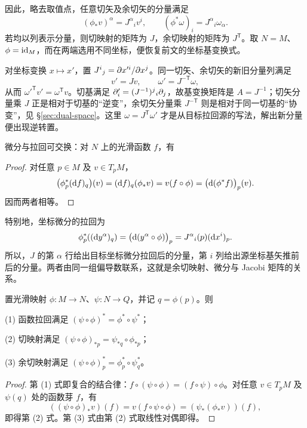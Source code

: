 因此，略去取值点，任意切矢及余切矢的分量满足
\[
    (\phi_*v)^\alpha=J^\alpha{}_i v^i,\qquad
    (\phi^*\omega)_i=J^\alpha{}_i\omega_\alpha.
\]
若均以列表示分量，则切映射的矩阵为 $J$，余切映射的矩阵为 $J^{\mathsf T}$。取 $N=M$、$\phi=\mathrm{id}_M$，而在两端选用不同坐标，便恢复前文的坐标基变换式。

\begin{remark}
    对坐标变换 $x\mapsto x'$，置 $J^i{}_j=\partial x'^i/\partial x^j$。同一切矢、余切矢的新旧分量列满足
    \[v'=Jv,\qquad \omega'=J^{-\mathsf T}\omega,\]
    从而 $\omega'^{\mathsf T}v'=\omega^{\mathsf T}v$。切基满足 $\partial'_i=(J^{-1})^j{}_i\partial_j$，故基变换矩阵是 $A=J^{-1}$；切矢分量乘 $J$ 正是相对于切基的“逆变”，余切矢分量乘 $J^{-\mathsf T}$ 则是相对于同一切基的“协变”，见 \S\ref{sec:dual-space}。这里 $\omega=J^{\mathsf T}\omega'$ 才是从目标拉回源的写法，解出新分量便出现逆转置。
\end{remark}

\begin{proposition}
    微分与拉回可交换：对 $N$ 上的光滑函数 $f$，有
\end{proposition}
\begin{proof}
    对任意 $p\in M$ 及 $v\in T_pM$，
    \[
        \bigl(\phi_p^*(\dd f)_q\bigr)(v)
        =(\dd f)_q(\phi_*v)=v(f\circ\phi)
        =\bigl(\dd(\phi^*f)\bigr)_p(v).
    \]
    因而两者相等。
\end{proof}

特别地，坐标微分的拉回为
\[
    \phi_p^*((\dd y^\alpha)_q)
    =\bigl(\dd(y^\alpha\circ\phi)\bigr)_p
    =J^\alpha{}_i(p)(\dd x^i)_p.
\]
所以，$J$ 的第 $\alpha$ 行给出目标坐标微分拉回后的分量，第 $i$ 列给出源坐标基矢推前后的分量。两者由同一组偏导数联系，这就是余切映射、微分与 Jacobi 矩阵的关系。

\begin{theorem}[链式法则]\label{chdm:thm_map-chain-rule}
    置光滑映射 $\phi:M\to N$、$\psi:N\to Q$，并记 $q=\phi(p)$。则

    (1) 函数拉回满足 $(\psi\circ\phi)^*=\phi^*\circ\psi^*$；

    (2) 切映射满足 $(\psi\circ\phi)_{*p}=\psi_{*q}\circ\phi_{*p}$；

    (3) 余切映射满足 $(\psi\circ\phi)^*_p=\phi_p^*\circ\psi_q^*$。
\end{theorem}
\begin{proof}
    第 (1) 式即复合的结合律：$f\circ(\psi\circ\phi)=(f\circ\psi)\circ\phi$。对任意 $v\in T_pM$ 及 $\psi(q)$ 处的函数芽 $f$，有
    \[
        ((\psi\circ\phi)_*v)(f)=v(f\circ\psi\circ\phi)
        =(\psi_*(\phi_*v))(f),
    \]
    即得第 (2) 式。第 (3) 式由第 (2) 式取线性对偶即得。
\end{proof}

